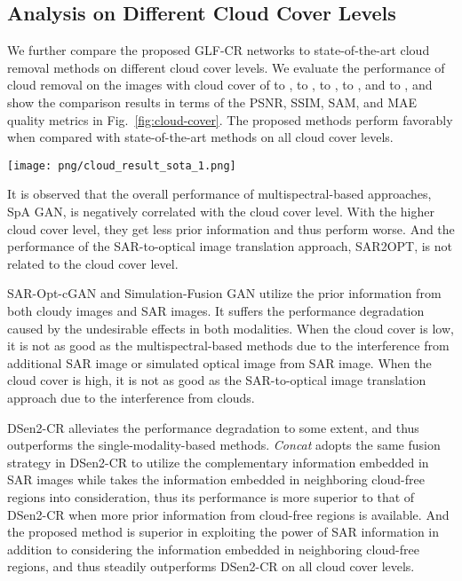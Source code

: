 \documentclass[a4paper,fleqn]{cas-dc}
\begin{document}
\subsection{Analysis on Different Cloud Cover Levels}
We further compare the proposed GLF-CR networks to state-of-the-art cloud removal methods on different cloud cover levels. We evaluate the performance of cloud removal on the images with cloud cover of  to ,  to ,  to ,  to , and  to , and show the comparison results in terms of the PSNR, SSIM, SAM, and MAE quality metrics in Fig.~\ref{fig:cloud-cover}. The proposed methods perform favorably when compared with state-of-the-art methods on all cloud cover levels. 






\begin{figure*}[!t]
     \centering
     \texttt{[image: png/cloud\_result\_sota\_1.png]}
     \vspace{-2mm}
     \caption{Quantitative comparisons of proposed GLF-Nets to state-of-the-art methods on different cloud cover levels in terms of the PSNR, SSIM, SAM, and MAE quality metrics.}
     \label{fig:cloud-cover}
     \vspace{-7mm}
\end{figure*} 
It is observed that the overall performance of multispectral-based approaches, SpA GAN, is negatively correlated with the cloud cover level. With the higher cloud cover level, they get less prior information and thus perform worse. And the performance of the SAR-to-optical image translation approach, SAR2OPT, is not related to the cloud cover level. 

SAR-Opt-cGAN and Simulation-Fusion GAN utilize the prior information from both cloudy images and SAR images. It suffers the performance degradation caused by the undesirable effects in both modalities. When the cloud cover is low, it is not as good as the multispectral-based methods due to the interference from additional SAR image or simulated optical image from SAR image. When the cloud cover is high, it is not as good as the SAR-to-optical image translation approach due to the interference from clouds.

DSen2-CR alleviates the performance degradation to some extent, and thus outperforms the single-modality-based methods. {\it Concat} adopts the same fusion strategy in DSen2-CR to utilize the complementary information embedded in SAR images while takes the information embedded in neighboring cloud-free regions into consideration, thus its performance is more superior to that of DSen2-CR when more prior information from cloud-free regions is available.
And the proposed method is superior in exploiting the power of SAR information in addition to considering the information embedded in neighboring cloud-free regions, and thus steadily outperforms DSen2-CR on all cloud cover levels.
\end{document}
